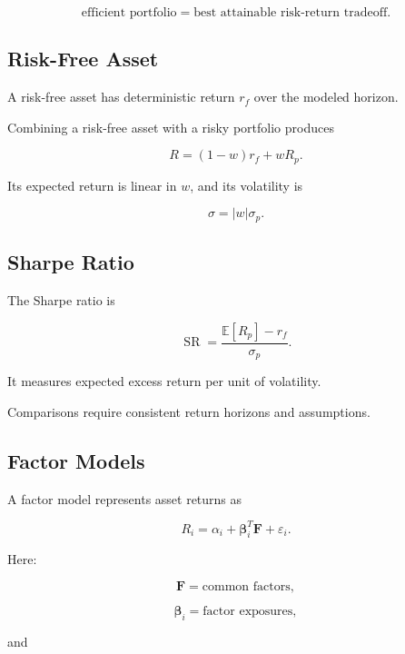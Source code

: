 \[
\boxed{
\text{efficient portfolio}
=
\text{best attainable risk-return tradeoff}.
}
\]

\subsection{Risk-Free Asset}
\label{subsec:risk-free-asset}

A risk-free asset has deterministic return \(r_f\) over the modeled horizon.

Combining a risk-free asset with a risky portfolio produces

\[
\boxed{
R
=
(1-w)r_f+wR_p.
}
\]

Its expected return is linear in \(w\), and its volatility is

\[
\boxed{
\sigma
=
|w|\sigma_p.
}
\]

\subsection{Sharpe Ratio}
\label{subsec:sharpe-ratio}

The Sharpe ratio is

\[
\boxed{
\operatorname{SR}
=
\frac{
\mathbb{E}[R_p]-r_f
}{
\sigma_p
}.
}
\]

It measures expected excess return per unit of volatility.

Comparisons require consistent return horizons and assumptions.

\subsection{Factor Models}
\label{subsec:financial-factor-models}

A factor model represents asset returns as

\[
\boxed{
R_i
=
\alpha_i
+
\boldsymbol{\beta}_i^T
\mathbf{F}
+
\varepsilon_i.
}
\]

Here:

\[
\mathbf{F}
=
\text{common factors},
\]

\[
\boldsymbol{\beta}_i
=
\text{factor exposures},
\]

and

